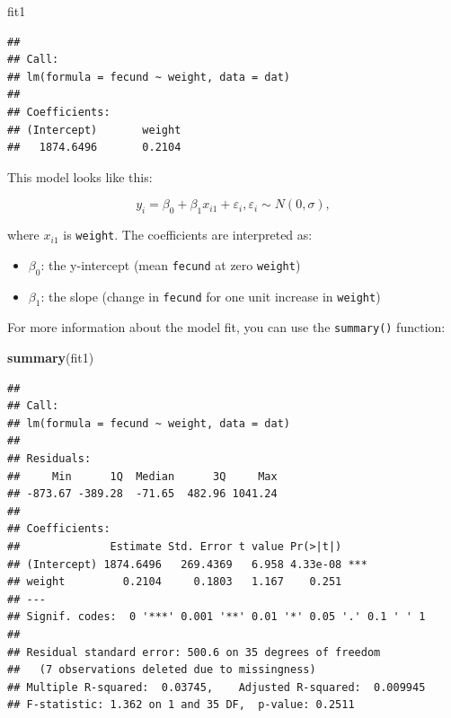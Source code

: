 \documentclass[]{book}
\newenvironment{Shaded}{\begin{snugshade}}{\end{snugshade}}
\newcommand{\KeywordTok}[1]{\textcolor[rgb]{0.13,0.29,0.53}{\textbf{#1}}}
\newcommand{\NormalTok}[1]{#1}
\providecommand{\tightlist}{%
  \setlength{\itemsep}{0pt}\setlength{\parskip}{0pt}}
\theoremstyle{definition}
\theoremstyle{definition}
\theoremstyle{definition}
\theoremstyle{remark}
\begin{document}
\begin{Shaded}
\begin{Highlighting}[]
\NormalTok{fit1}
\end{Highlighting}
\end{Shaded}

\begin{verbatim}
## 
## Call:
## lm(formula = fecund ~ weight, data = dat)
## 
## Coefficients:
## (Intercept)       weight  
##   1874.6496       0.2104
\end{verbatim}

This model looks like this:

\begin{equation}
  y_i=\beta_0 + \beta_1 x_{i1} + \varepsilon_i, \varepsilon_i \sim N(0,\sigma),
\label{eq:lin-reg}
\end{equation}

where \(x_{i1}\) is \texttt{weight}. The coefficients are interpreted
as:

\begin{itemize}
\tightlist
\item
  \(\beta_0\): the y-intercept (mean \texttt{fecund} at zero
  \texttt{weight})
\item
  \(\beta_1\): the slope (change in \texttt{fecund} for one unit
  increase in \texttt{weight})
\end{itemize}

For more information about the model fit, you can use the
\texttt{summary()} function:

\begin{Shaded}
\begin{Highlighting}[]
\KeywordTok{summary}\NormalTok{(fit1)}
\end{Highlighting}
\end{Shaded}

\begin{verbatim}
## 
## Call:
## lm(formula = fecund ~ weight, data = dat)
## 
## Residuals:
##     Min      1Q  Median      3Q     Max 
## -873.67 -389.28  -71.65  482.96 1041.24 
## 
## Coefficients:
##              Estimate Std. Error t value Pr(>|t|)    
## (Intercept) 1874.6496   269.4369   6.958 4.33e-08 ***
## weight         0.2104     0.1803   1.167    0.251    
## ---
## Signif. codes:  0 '***' 0.001 '**' 0.01 '*' 0.05 '.' 0.1 ' ' 1
## 
## Residual standard error: 500.6 on 35 degrees of freedom
##   (7 observations deleted due to missingness)
## Multiple R-squared:  0.03745,    Adjusted R-squared:  0.009945 
## F-statistic: 1.362 on 1 and 35 DF,  p-value: 0.2511
\end{verbatim}
\end{document}
